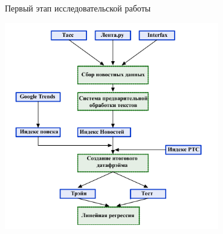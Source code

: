 \documentclass[c, dvipsnames]{beamer}  %
\begin{document}
\begin{frame}{Первый этап исследовательской работы}
 \begin{center}
 	\includegraphics[width=0.7\textwidth]{etappp_1.png}
 \end{center}
 \end{frame}
\end{document}
